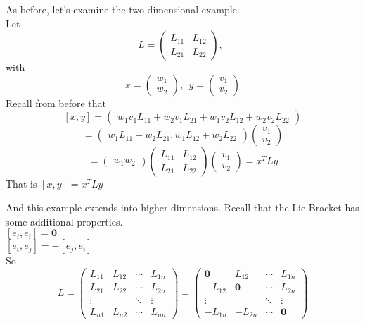 \documentclass[11 pt]{article}
\newcommand{\br}[2]{\left[#1,#2\right]}
\newcommand{\zvec}{\mathbf{0}}
\begin{document}
    \begin{example}
        As before, let's examine the two dimensional example.
\\    Let
    $$
     L = \begin{pmatrix}
            L_{11} & L_{12} \\
            L_{21} & L_{22}
         \end{pmatrix},\ \ 
    $$
    with
    $$
     x = \begin{pmatrix}
            w_1\\
            w_2
         \end{pmatrix},\ \ 
     y = \begin{pmatrix}
             v_1\\
             v_2
         \end{pmatrix}
    $$
    Recall from before that 
    $$
    \br{x}{y} = \begin{pmatrix}
                    w_1v_1L_{11} + w_2v_1L_{21} + w_1v_2L_{12}+w_2v_2L_{22}
                \end{pmatrix}
    $$
    $$
        = \begin{pmatrix}
            w_1L_{11} + w_2L_{21}, w_1L_{12}+w_2L_{22}
        \end{pmatrix}
        \begin{pmatrix}
            v_1 \\
            v_2
        \end{pmatrix}
    $$
    $$
        = \begin{pmatrix}
            w_1 w_2
        \end{pmatrix}
        \begin{pmatrix}
            L_{11} & L_{12} \\
            L_{21} & L_{22}
        \end{pmatrix}
        \begin{pmatrix}
            v_1 \\
            v_2
        \end{pmatrix}
        = x^{T}Ly
    $$
    That is
    $\br{x}{y} = x^TLy$
    \end{example}
    And this example extends into higher dimensions.  Recall that the Lie
    Bracket has some additional properties.
    \\$[e_i,e_i] = \zvec$
    \\$[e_i, e_j] = -[e_j, e_i]$
    \\So
    $$
     L = \begin{pmatrix}
        L_{11} & L_{12} & \cdots & L_{1n} \\
        L_{21} & L_{22} & \cdots & L_{2n} \\
        \vdots &        & \ddots & \vdots \\
        L_{n1} & L_{n2} & \cdots & L_{nn}
    \end{pmatrix}
    = \begin{pmatrix}
               \zvec& L_{12}  & \cdots & L_{1n} \\
               -L_{12}& \zvec & \cdots & L_{2n} \\
               \vdots &       & \ddots & \vdots \\
               -L_{1n}&-L_{2n}& \cdots & \zvec
        \end{pmatrix}
    $$
\end{document}
